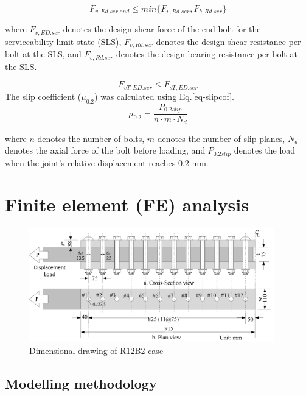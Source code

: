 \begin{equation}
    F_{v,Ed.ser.end} \leq min\{F_{v,Rd.ser}, F_{b,Rd.ser}\}
    \label{eq-FV}
\end{equation}

where $F_{v,ED.ser}$ denotes the design shear force of the end bolt for the serviceability limit state (SLS), $F_{v,Rd.ser}$ denotes the design shear resistance per bolt at the SLS, and $F_{v,Rd.ser}$ denotes the design bearing resistance per bolt at the SLS.

\begin{equation}
    F_{vT,ED.ser} \leq F_{sT,ED.ser}
\end{equation}
The slip coefficient ($\mu_{0.2}$) was calculated using Eq.\ref{eq-slipcof}.
\begin{equation}
    \mu_{0.2} = \frac{P_{0.2slip}}{n \cdot m \cdot N_d}
    \label{eq-slipcof}
\end{equation}

where $n$ denotes the number of bolts, $m$ denotes the number of slip planes, $N_d$ denotes the axial force of the bolt before loading, and $P_{0.2slip}$ denotes the load when the joint's relative displacement reaches 0.2 mm.


\section{Finite element (FE) analysis}

\begin{figure}[htbp]
    \centering
    \includegraphics[width=0.95\textwidth]{imgs/ch5/femodelsize.pdf}
    \caption{Dimensional drawing of R12B2 case}
    \label{fig-modelsize}
\end{figure}

\subsection{Modelling methodology}

